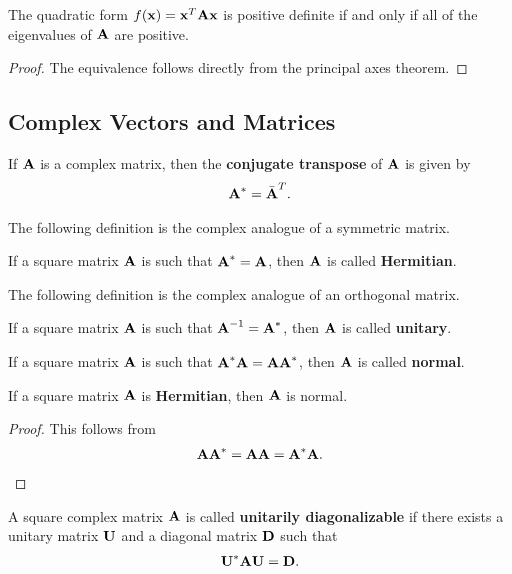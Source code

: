 \documentclass{memoir}
\begin{document}
\begin{theorem}
    The quadratic form $f(\boldsymbol{\mathbf{x}})=\boldsymbol{\mathbf{x}}^T \boldsymbol{\mathbf{A}} \boldsymbol{\mathbf{x}}$ is positive definite if and only if all of the eigenvalues of $\boldsymbol{\mathbf{A}}$ are positive.
\end{theorem}
\begin{proof}
    The equivalence follows directly from the principal axes theorem.
\end{proof}

\subsection{Complex Vectors and Matrices}
\begin{definition}
    If $\boldsymbol{\mathbf{A}}$ is a complex matrix, then the \textbf{conjugate transpose} of $\boldsymbol{\mathbf{A}}$ is given by
    \begin{align*}
        \boldsymbol{\mathbf{A}}^* = \bar{\boldsymbol{\mathbf{A}}}^T.
    \end{align*}
\end{definition}
The following definition is the complex analogue of a symmetric matrix.
\begin{definition}
    If a square matrix $\boldsymbol{\mathbf{A}}$ is such that $\boldsymbol{\mathbf{A}}^* = \boldsymbol{\mathbf{A}}$, then $\boldsymbol{\mathbf{A}}$ is called \textbf{Hermitian}.
\end{definition}
The following definition is the complex analogue of an orthogonal matrix.
\begin{definition}
    If a square matrix $\boldsymbol{\mathbf{A}}$ is such that $\boldsymbol{\mathbf{A}}^{-1} = \boldsymbol{\mathbf{A}}^*$, then $\boldsymbol{\mathbf{A}}$ is called \textbf{unitary}.
\end{definition}
\begin{definition}
    If a square matrix $\boldsymbol{\mathbf{A}}$ is such that $\boldsymbol{\mathbf{A}}^* \boldsymbol{\mathbf{A}} = \boldsymbol{\mathbf{A}} \boldsymbol{\mathbf{A}}^*$, then $\boldsymbol{\mathbf{A}}$ is called \textbf{normal}.
\end{definition}
\begin{theorem}
    If a square matrix $\boldsymbol{\mathbf{A}}$ is \textbf{Hermitian}, then $\boldsymbol{\mathbf{A}}$ is normal.
\end{theorem}
\begin{proof}
    This follows from
    \begin{align*}
        \boldsymbol{\mathbf{A}}\boldsymbol{\mathbf{A}}^* = \boldsymbol{\mathbf{A}} \boldsymbol{\mathbf{A}} = \boldsymbol{\mathbf{A}}^* \boldsymbol{\mathbf{A}}.
    \end{align*}
\end{proof}
\begin{definition}
    A square complex matrix $\boldsymbol{\mathbf{A}}$ is called \textbf{unitarily diagonalizable} if there exists a unitary matrix $\boldsymbol{\mathbf{U}}$ and a diagonal matrix $\boldsymbol{\mathbf{D}}$ such that
    \begin{align*}
        \boldsymbol{\mathbf{U}}^* \boldsymbol{\mathbf{A}} \boldsymbol{\mathbf{U}} = \boldsymbol{\mathbf{D}}.
    \end{align*}
\end{definition}
\end{document}
